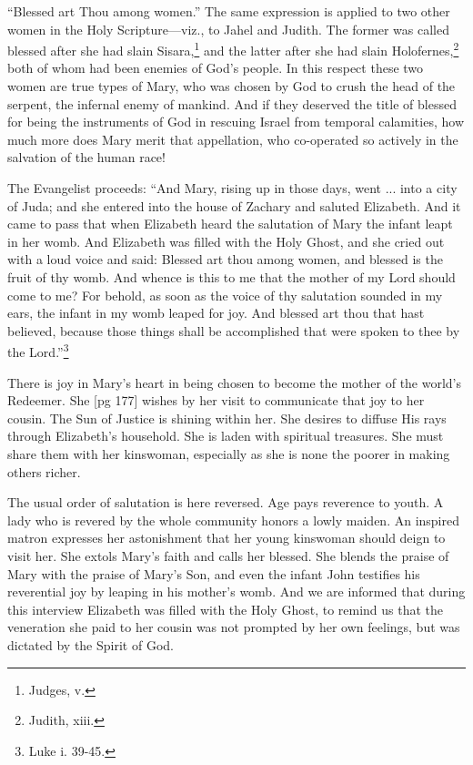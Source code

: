 “Blessed art Thou among women.” The same
expression is applied to two other women in the
Holy Scripture—viz., to Jahel and Judith. The
former was called blessed after she had slain
Sisara,\footnote{Judges, v.}
and the latter after she had slain Holofernes,\footnote{Judith, xiii.}
both of whom had been enemies of God's
people. In this respect these two women are true
types of Mary, who was chosen by God to crush
the head of the serpent, the infernal enemy of mankind.
And if they deserved the title of blessed for
being the instruments of God in rescuing Israel
from temporal calamities, how much more does
Mary merit that appellation, who co-operated so
actively in the salvation of the human race!

The Evangelist proceeds: “And Mary, rising
up in those days, went ... into a city of Juda;
and she entered into the house of Zachary and
saluted Elizabeth. And it came to pass that when
Elizabeth heard the salutation of Mary the infant
leapt in her womb. And Elizabeth was filled
with the Holy Ghost, and she cried out with a loud
voice and said: Blessed art thou among women,
and blessed is the fruit of thy womb. And whence
is this to me that the mother of my Lord should
come to me? For behold, as soon as the voice of
thy salutation sounded in my ears, the infant in my
womb leaped for joy. And blessed art thou that
hast believed, because those things shall be accomplished
that were spoken to thee by the Lord.”\footnote{Luke i. 39-45.}

There is joy in Mary's heart in being chosen to
become the mother of the world's Redeemer. She
[pg 177]
wishes by her visit to communicate that joy to her
cousin. The Sun of Justice is shining within her.
She desires to diffuse His rays through Elizabeth's
household. She is laden with spiritual treasures.
She must share them with her kinswoman, especially
as she is none the poorer in making others
richer.

The usual order of salutation is here reversed.
Age pays reverence to youth. A lady who is revered
by the whole community honors a lowly
maiden. An inspired matron expresses her astonishment
that her young kinswoman should deign
to visit her. She extols Mary's faith and calls her
blessed. She blends the praise of Mary with the
praise of Mary's Son, and even the infant John
testifies his reverential joy by leaping in his mother's
womb. And we are informed that during this
interview Elizabeth was filled with the Holy Ghost,
to remind us that the veneration she paid to her
cousin was not prompted by her own feelings, but
was dictated by the Spirit of God.

